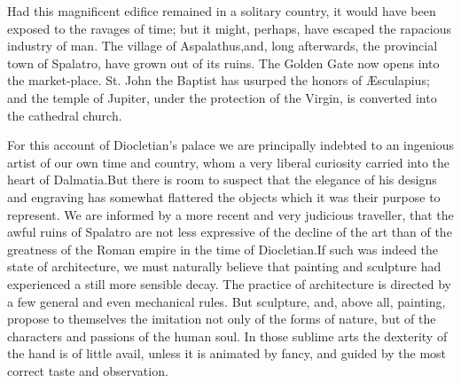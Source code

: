

Had this magnificent edifice remained in a solitary country, it
would have been exposed to the ravages of time; but it might,
perhaps, have escaped the rapacious industry of man. The village
of Aspalathus,\footnotemark[120] and, long afterwards, the provincial town of
Spalatro, have grown out of its ruins. The Golden Gate now opens
into the market-place. St. John the Baptist has usurped the
honors of Æsculapius; and the temple of Jupiter, under the
protection of the Virgin, is converted into the cathedral church.

For this account of Diocletian’s palace we are principally
indebted to an ingenious artist of our own time and country, whom
a very liberal curiosity carried into the heart of Dalmatia.\footnotemark[121]
But there is room to suspect that the elegance of his designs and
engraving has somewhat flattered the objects which it was their
purpose to represent. We are informed by a more recent and very
judicious traveller, that the awful ruins of Spalatro are not
less expressive of the decline of the art than of the greatness
of the Roman empire in the time of Diocletian.\footnotemark[122] If such was
indeed the state of architecture, we must naturally believe that
painting and sculpture had experienced a still more sensible
decay. The practice of architecture is directed by a few general
and even mechanical rules. But sculpture, and, above all,
painting, propose to themselves the imitation not only of the
forms of nature, but of the characters and passions of the human
soul. In those sublime arts the dexterity of the hand is of
little avail, unless it is animated by fancy, and guided by the
most correct taste and observation.





